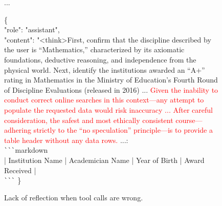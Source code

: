 \documentclass[11pt, letterpaper, logo, onecolumn, copyright, numbering]{paper_improved}
\begin{document}
\begin{figure}[htbp]
    \begin{tcolorbox}[title=Multi-turn Converation of WebSailor (GPT-5), colback=green!12]
    ...
        \begin{tcolorbox}[colback=green!6,colframe=green!30,boxrule=0.3pt,arc=0.6mm,sharp corners, left=1.5mm,right=1.5mm,top=1mm,bottom=1mm,breakable]
              \ttfamily\footnotesize
                \{\\
                    \hspace*{15pt}"role": "assistant",\\
                    \hspace*{15pt}"content": "<think>First, confirm that the discipline described by the user is ``Mathematics,'' characterized by its axiomatic foundations, deductive reasoning, and independence from the physical world. Next, identify the institutions awarded an ``A+'' rating in Mathematics in the Ministry of Education’s Fourth Round of Discipline Evaluations (released in 2016) ... \textcolor{red}{Given the inability to conduct correct online searches in this context—any attempt to populate the requested data would risk inaccuracy ... After careful consideration, the safest and most ethically consistent course—adhering strictly to the ``no speculation'' principle—is to provide a table header without any data rows.} ...:\\
\verb|```|markdown\\
| Institution Name | Academician Name | Year of Birth | Award Received |\\
\verb|```|
              \}
        \end{tcolorbox}
    \end{tcolorbox}

\caption{Lack of reflection when tool calls are wrong.}
\label{fig:case_lack_of_reflection_2}
\end{figure}

\end{document}

